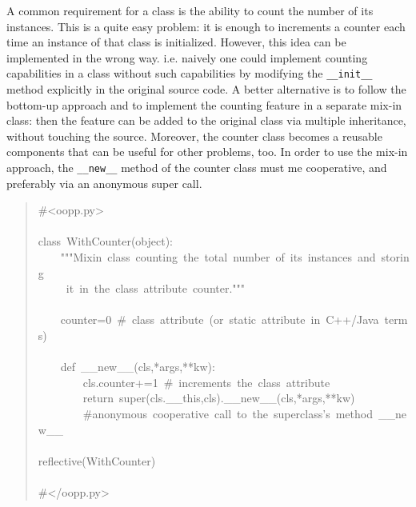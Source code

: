 \documentclass[10pt,english]{article}
\begin{document}
A common requirement for a class is the ability to count the number of its
instances. This is a quite easy problem: it is enough to increments a counter 
each time an instance of that class is initialized. However, this idea can
be implemented in the wrong way. i.e. naively one could implement
counting capabilities in a class without such capabilities by modifying the
\texttt{{\_}{\_}init{\_}{\_}} method explicitly in the original source code. 
A better alternative is to follow the bottom-up approach and to implement 
the counting feature in a separate mix-in class: then the feature can be 
added to the original class via multiple inheritance, without touching 
the source.
Moreover, the counter class becomes a reusable components that can be
useful for other problems, too. In order to use the mix-in approach, the 
\texttt{{\_}{\_}new{\_}{\_}} method of the counter class must me cooperative, and preferably
via an anonymous super call.
\begin{quote}
\begin{ttfamily}\begin{flushleft}
\mbox{{\#}<oopp.py>}\\
\mbox{}\\
\mbox{class~WithCounter(object):~}\\
\mbox{~~~~"""Mixin~class~counting~the~total~number~of~its~instances~and~storing~}\\
\mbox{~~~~~it~in~the~class~attribute~counter."""}\\
\mbox{}\\
\mbox{~~~~counter=0~{\#}~class~attribute~(or~static~attribute~in~C++/Java~terms)}\\
\mbox{~}\\
\mbox{~~~~def~{\_}{\_}new{\_}{\_}(cls,*args,**kw):}\\
\mbox{~~~~~~~~cls.counter+=1~{\#}~increments~the~class~attribute}\\
\mbox{~~~~~~~~return~super(cls.{\_}{\_}this,cls).{\_}{\_}new{\_}{\_}(cls,*args,**kw)~~}\\
\mbox{~~~~~~~~{\#}anonymous~cooperative~call~to~the~superclass's~method~{\_}{\_}new{\_}{\_}}\\
\mbox{}\\
\mbox{reflective(WithCounter)}\\
\mbox{}\\
\mbox{{\#}</oopp.py>}
\end{flushleft}\end{ttfamily}
\end{quote}
\end{document}
